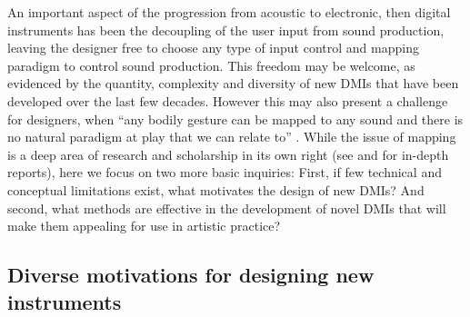 \documentclass[letterpaper, 12pt]{article}
\begin{document}
An important aspect of the progression from acoustic to electronic, then digital instruments has been the decoupling of the user input from sound production, leaving the designer free to choose any type of input control and mapping paradigm to control sound production. This freedom may be welcome, as evidenced by the quantity, complexity and diversity of new DMIs that have been developed over the last few decades.
However this may also present a challenge for designers, when ``any bodily gesture can be mapped to any sound and there is no natural paradigm at play that we can relate to'' \citep*[p. 34]{Magnusson2019}. While the issue of mapping is a deep area of research and scholarship in its own right (see \citet{os-mapping-2002} and \citet{cmj-mapping-2014} for in-depth reports), here we focus on two more basic inquiries: First, if few technical and conceptual limitations exist, what motivates the design of new DMIs? And second, what methods are effective in the development of novel DMIs that will make them appealing for use in artistic practice?

\subsection{Diverse motivations for designing new instruments}
\label{ch3-sec:diverse-motivations-for-designing-new-instruments}
\end{document}
